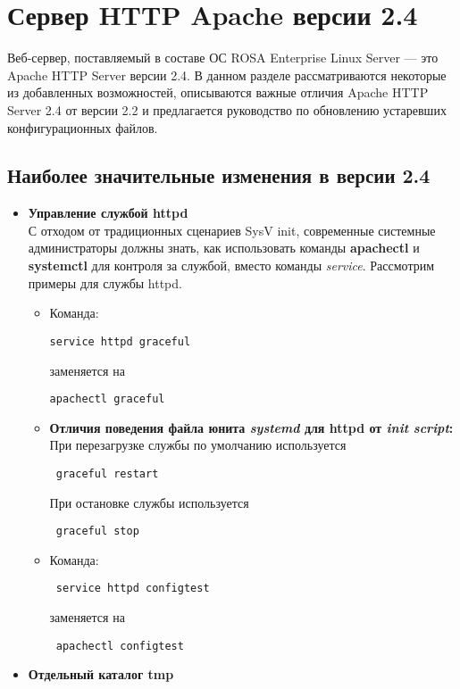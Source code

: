 \documentclass[a4paper,10pt,twoside]{article}
\begin{document}
\section{Сервер HTTP Apache версии 2.4}

Веб-сервер, поставляемый в составе ОС ROSA Enterprise Linux Server — это Apache HTTP Server версии 2.4. В данном разделе рассматриваются некоторые из добавленных возможностей, описываются важные отличия Apache HTTP Server 2.4 от версии 2.2 и предлагается руководство по обновлению устаревших конфигурационных файлов.

\subsection{Наиболее значительные изменения в версии 2.4}
\begin{itemize}
 \item \textbf{Управление службой httpd}\\ 
С отходом от традиционных сценариев SysV init, современные системные администраторы должны знать, как использовать команды \textbf{apachectl} и \textbf{systemctl} для контроля за службой, вместо команды \textit{service}. Рассмотрим примеры для службы httpd.
\begin{itemize}
 \item Команда:
\begin{verbatim}
service httpd graceful
\end{verbatim} 
заменяется на
\begin{verbatim}
apachectl graceful
\end{verbatim} 
\item \textbf{Отличия поведения файла юнита \textit{systemd} для httpd от \textit{init script}:}\\
При перезагрузке службы по умолчанию используется 
\begin{verbatim}
 graceful restart
\end{verbatim} 
При остановке службы используется 
\begin{verbatim}
 graceful stop
\end{verbatim} 
\item Команда:
\begin{verbatim}
 service httpd configtest
\end{verbatim} 
заменяется на
\begin{verbatim}
 apachectl configtest
\end{verbatim} 
\end{itemize}
\item \textbf{Отдельный каталог tmp}\\

\end{itemize}
\end{document}
